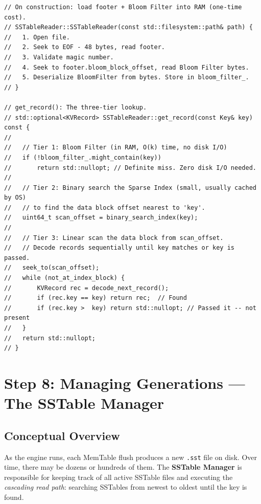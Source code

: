 \documentclass[11pt,a4paper]{article}
\begin{document}
\begin{lstlisting}[style=cpp, caption={SSTable Search Strategy (conceptual from \texttt{src/sstable\_reader.cpp})}]
// On construction: load footer + Bloom Filter into RAM (one-time cost).
// SSTableReader::SSTableReader(const std::filesystem::path& path) {
//   1. Open file.
//   2. Seek to EOF - 48 bytes, read footer.
//   3. Validate magic number.
//   4. Seek to footer.bloom_block_offset, read Bloom Filter bytes.
//   5. Deserialize BloomFilter from bytes. Store in bloom_filter_.
// }

// get_record(): The three-tier lookup.
// std::optional<KVRecord> SSTableReader::get_record(const Key& key) const {
//
//   // Tier 1: Bloom Filter (in RAM, O(k) time, no disk I/O)
//   if (!bloom_filter_.might_contain(key))
//       return std::nullopt; // Definite miss. Zero disk I/O needed.
//
//   // Tier 2: Binary search the Sparse Index (small, usually cached by OS)
//   // to find the data block offset nearest to 'key'.
//   uint64_t scan_offset = binary_search_index(key);
//
//   // Tier 3: Linear scan the data block from scan_offset.
//   // Decode records sequentially until key matches or key is passed.
//   seek_to(scan_offset);
//   while (not_at_index_block) {
//       KVRecord rec = decode_next_record();
//       if (rec.key == key) return rec;  // Found
//       if (rec.key >  key) return std::nullopt; // Passed it -- not present
//   }
//   return std::nullopt;
// }
\end{lstlisting}

\section{Step 8: Managing Generations --- The SSTable Manager}
\label{sec:sstable_manager}

\subsection{Conceptual Overview}

As the engine runs, each MemTable flush produces a new \texttt{.sst} file on
disk. Over time, there may be dozens or hundreds of them. The
\textbf{SSTable Manager} is responsible for keeping track of all active SSTable
files and executing the \emph{cascading read path}: searching SSTables from
newest to oldest until the key is found.
\end{document}
